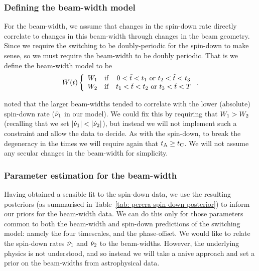 \documentclass[../full_thesis/full_thesis.tex]{subfiles}
\begin{document}
\subsubsection{Defining the beam-width model}

For the beam-width, we assume that changes in the spin-down rate directly
correlate to changes in this beam-width through changes in the beam geometry.
Since we require the switching to be doubly-periodic for the spin-down to make
sense, so we must require the beam-width to be doubly periodic. That is we
define the beam-width model to be
\begin{align}
W(t) \left\{
    \begin{array}{ccc}
    W_{1} & \mathrm{if} & 0 < \tilde{t} < t_{1}
    \textrm{ or } t_{2} < \tilde{t} < t_{3}\\
    W_{2} & \mathrm{if} & t_{1} < \tilde{t} < t_{2}
    \textrm{ or } t_{3} < \tilde{t} < T\\
    \end{array}
    \right..
\label{eqn: switching beam-width model}
\end{align}

\citet{Lyne2010} noted that the larger beam-widths tended to correlate with the
lower (absolute) spin-down rate ($\dot{\nu}_{1}$ in our model). We could fix this
by requiring that $W_{1} > W_{2}$ (recalling that we set $|\dot{\nu}_{1}| <
|\dot{\nu}_{2}|$), but instead we will not implement such a constraint and allow
the data to decide.  As with the spin-down, to break the degeneracy in the
times we will require again that $t_{\mathrm{A}} \ge t_{\mathrm{C}}$. We will not assume any
secular changes in the beam-width for simplicity.

\subsubsection{Parameter estimation for the beam-width}

Having obtained a sensible fit to the spin-down data, we use the resulting
posteriors (as summarised in Table~\ref{tab: perera spin-down posterior}) to
inform our priors for the beam-width data. We can do this only for those
parameters common to both the beam-width and spin-down predictions of the
switching model: namely the four timescales, and the phase-offset. We would
like to relate the spin-down rates $\dot{\nu}_{1}$ and $\dot{\nu}_{2}$ to the
beam-widths. However, the underlying physics is not
understood, and so instead we will take a naive approach and set a prior on the
beam-widths from astrophysical data.
\end{document}
